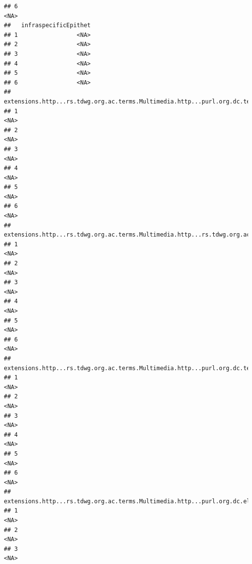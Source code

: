 \documentclass[
]{book}
\begin{document}
\begin{verbatim}
## 6                                                                              <NA>
##   infraspecificEpithet
## 1                 <NA>
## 2                 <NA>
## 3                 <NA>
## 4                 <NA>
## 5                 <NA>
## 6                 <NA>
##   extensions.http...rs.tdwg.org.ac.terms.Multimedia.http...purl.org.dc.terms.identifier.1
## 1                                                                                    <NA>
## 2                                                                                    <NA>
## 3                                                                                    <NA>
## 4                                                                                    <NA>
## 5                                                                                    <NA>
## 6                                                                                    <NA>
##   extensions.http...rs.tdwg.org.ac.terms.Multimedia.http...rs.tdwg.org.ac.terms.taxonCoverage.1
## 1                                                                                          <NA>
## 2                                                                                          <NA>
## 3                                                                                          <NA>
## 4                                                                                          <NA>
## 5                                                                                          <NA>
## 6                                                                                          <NA>
##   extensions.http...rs.tdwg.org.ac.terms.Multimedia.http...purl.org.dc.terms.modified.1
## 1                                                                                  <NA>
## 2                                                                                  <NA>
## 3                                                                                  <NA>
## 4                                                                                  <NA>
## 5                                                                                  <NA>
## 6                                                                                  <NA>
##   extensions.http...rs.tdwg.org.ac.terms.Multimedia.http...purl.org.dc.elements.1.1.type.1
## 1                                                                                     <NA>
## 2                                                                                     <NA>
## 3                                                                                     <NA>

\end{verbatim}
\end{document}
